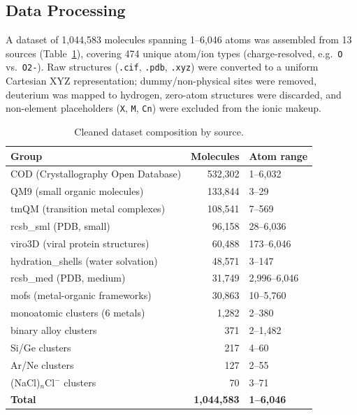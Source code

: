 \documentclass[final]{article}
\begin{document}
\subsection{Data Processing}

A dataset of 1,044,583 molecules spanning 1--6,046 atoms was assembled
from 13 sources (Table~\ref{tab:dataset}), covering 474 unique atom/ion types
(charge-resolved, e.g.\ \texttt{O} vs.\ \texttt{O2-}). Raw structures (\texttt{.cif},
\texttt{.pdb}, \texttt{.xyz}) were converted to a uniform Cartesian XYZ representation;
dummy/non-physical sites were removed, deuterium was mapped to hydrogen, zero-atom
structures were discarded, and non-element placeholders (\texttt{X}, \texttt{M},
\texttt{Cn}) were excluded from the ionic makeup.

\begin{table}[h]
\centering
\small
\caption{Cleaned dataset composition by source.}
\label{tab:dataset}
\begin{tabular}{lrl}
\toprule
Group & Molecules & Atom range \\
\midrule
COD (Crystallography Open Database)     & 532,302 & 1--6,032 \\
QM9 (small organic molecules)           & 133,844 & 3--29 \\
tmQM (transition metal complexes)       & 108,541 & 7--569 \\
rcsb\_sml (PDB, small)                  & 96,158  & 28--6,036 \\
viro3D (viral protein structures)       & 60,488  & 173--6,046 \\
hydration\_shells (water solvation)     & 48,571  & 3--147 \\
rcsb\_med (PDB, medium)                 & 31,749  & 2,996--6,046 \\
mofs (metal-organic frameworks)         & 30,863  & 10--5,760 \\
monoatomic clusters (6 metals)          & 1,282   & 2--380 \\
binary alloy clusters                   & 371     & 2--1,482 \\
Si/Ge clusters                          & 217     & 4--60 \\
Ar/Ne clusters                          & 127     & 2--55 \\
(NaCl)$_n$Cl$^-$ clusters               & 70      & 3--71 \\
\midrule
\textbf{Total} & \textbf{1,044,583} & \textbf{1--6,046} \\
\bottomrule
\end{tabular}
\end{table}
\end{document}
